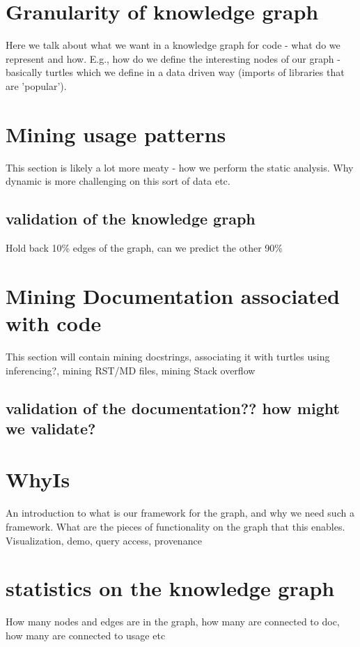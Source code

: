 \section{Granularity of knowledge graph}
Here we talk about what we want in a knowledge graph for code - what do we represent and how.  E.g., how do we define the interesting nodes of our graph - basically turtles which we define in a data driven way (imports of libraries that are 'popular').
\section{Mining usage patterns}
This section is likely a lot more meaty - how we perform the static analysis.  Why dynamic is more challenging on this sort of data etc.
\subsection{validation of the knowledge graph}
Hold back 10\% edges of the graph, can we predict the other 90\%
\section{Mining Documentation associated with code}
This section will contain mining docstrings, associating it with turtles using inferencing?, mining RST/MD files, mining Stack overflow
\subsection{validation of the documentation?? how might we validate?}
\section{WhyIs} An introduction to what is our framework for the graph, and why we need such a framework.  What are the pieces of functionality on the graph that this enables. Visualization, demo, query access, provenance 
\section{statistics on the knowledge graph}
How many nodes and edges are in the graph, how many are connected to doc, how many are connected to usage etc
